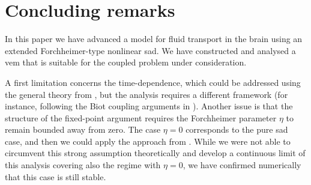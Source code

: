 \documentclass[fleqn,a4paper]{cas-sc}
\newcommand{\0}{\boldsymbol{0}}
\numberwithin{equation}{section}
\numberwithin{figure}{section}
\begin{document}
\section{{Concluding remarks}}\label{sec:concl}
{In this paper we have advanced a model for fluid transport in the brain using an extended Forchheimer-type nonlinear \gls{sad}. We have constructed and analysed a \gls{vem} that is suitable for the coupled problem under consideration. 

A first limitation   concerns the time-dependence, which could be addressed using the general theory from \cite{showalter1997}, but the analysis requires a different framework (for instance, following the  Biot coupling arguments in \cite{caucao2024banach}). Another issue  is that the structure of the fixed-point argument requires the Forchheimer parameter $\eta$ to remain bounded away from zero. 
The case  $\eta=0$ corresponds to the pure \gls{sad} case, and then we could apply the approach from \cite{gomez23}. 
While we were not able to circumvent this strong assumption theoretically and develop a continuous limit of this analysis covering also the regime with $\eta=0$, we have confirmed numerically that this case is still stable.} 
\end{document}
